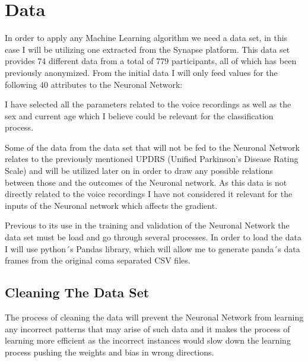 \documentclass[12pt, a4paper]{article}
\begin{document}
	
	\clearpage
	
	\section{Data}
	\label{sec:Data}
	
	In order to apply any Machine Learning algorithm we need a data set, in this case I will be utilizing one extracted from the Synapse platform. This data set provides 74 different data from a total of 779 participants, all of which has been previously anonymized. From the initial data I will only feed values for the following 40 attributes to the Neuronal Network:
	
	\vspace{5mm}
	
	
	
	\vspace{5mm}
	
	I have selected all the parameters related to the voice recordings as well as the sex and current age which I believe could be relevant for the classification process.
	 
	Some of the data from the data set that will not be fed to the Neuronal Network relates to the previously mentioned UPDRS (Unified Parkinson's Disease Rating Scale) and will be utilized later on in order to draw any possible relations between those and the outcomes of the Neuronal network. As this data is not directly related to the voice recordings I have not considered it relevant for the inputs of the Neuronal network which affects the gradient.
	
	Previous to its use in the training and validation of the Neuronal Network the data set must be load and go through several processes. In order to load the data I will use python´s Pandas library, which will allow me to generate panda´s data frames from the original coma separated CSV files.
	
	\clearpage
	
	\subsection{Cleaning The Data Set }
	
	The process of cleaning the data will prevent the Neuronal Network from learning any incorrect patterns that may arise of such data and it makes the process of learning more efficient as the incorrect instances would slow down the learning process pushing the weights and bias in wrong directions.
	
\end{document}
